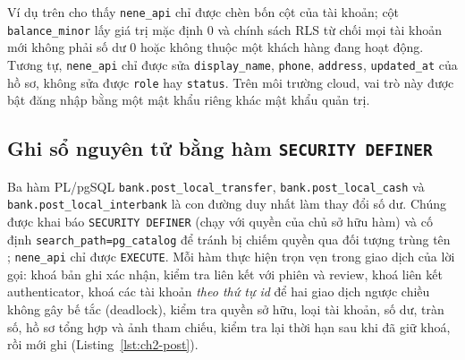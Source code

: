 Ví dụ trên cho thấy \texttt{nene\_\allowbreak{}api} chỉ được chèn bốn cột của tài khoản; cột \texttt{balance\_\allowbreak{}minor} lấy giá trị mặc định 0 và chính sách RLS từ chối mọi tài khoản mới không phải số dư 0 hoặc không thuộc một khách hàng đang hoạt động. Tương tự, \texttt{nene\_\allowbreak{}api} chỉ được sửa \texttt{display\_\allowbreak{}name}, \texttt{phone}, \texttt{address}, \texttt{updated\_\allowbreak{}at} của hồ sơ, không sửa được \texttt{role} hay \texttt{status}. Trên môi trường cloud, vai trò này được bật đăng nhập bằng một mật khẩu riêng khác mật khẩu quản trị.

\subsection{Ghi sổ nguyên tử bằng hàm \texttt{SECURITY DEFINER}}
\label{sec:ch2-atomic}

Ba hàm PL/pgSQL \texttt{bank.\allowbreak{}post\_\allowbreak{}local\_\allowbreak{}transfer}, \texttt{bank.\allowbreak{}post\_\allowbreak{}local\_\allowbreak{}cash} và \texttt{bank.\allowbreak{}post\_\allowbreak{}local\_\allowbreak{}interbank} là con đường duy nhất làm thay đổi số dư. Chúng được khai báo \texttt{SECURITY DEFINER} (chạy với quyền của chủ sở hữu hàm) và cố định \texttt{search\_\allowbreak{}path=pg\_\allowbreak{}catalog} để tránh bị chiếm quyền qua đối tượng trùng tên \parencite{ch2-pg-create-function}; \texttt{nene\_\allowbreak{}api} chỉ được \texttt{EXECUTE}. Mỗi hàm thực hiện trọn vẹn trong giao dịch của lời gọi: khoá bản ghi xác nhận, kiểm tra liên kết với phiên và review, khoá liên kết authenticator, khoá các tài khoản \emph{theo thứ tự id} để hai giao dịch ngược chiều không gây bế tắc (deadlock), kiểm tra quyền sở hữu, loại tài khoản, số dư, tràn số, hồ sơ tổng hợp và ảnh tham chiếu, kiểm tra lại thời hạn sau khi đã giữ khoá, rồi mới ghi (Listing~\ref{lst:ch2-post}).

